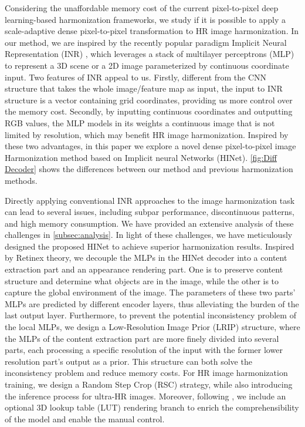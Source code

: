 \documentclass[10pt,journal,twocolumn,twoside]{IEEEtran}
\begin{document}
Considering the unaffordable memory cost of the current pixel-to-pixel deep learning-based harmonization frameworks, we study if it is possible to apply a scale-adaptive dense pixel-to-pixel transformation to HR image harmonization. In our method, we are inspired by the recently popular paradigm Implicit Neural Representation (INR) \cite{sitzmann2020implicit, tancik2020fourier}, which leverages a stack of multilayer perceptrons (MLP) to represent a 3D scene \cite{mildenhall2021nerf} or a 2D image \cite{sitzmann2020implicit} parameterized by continuous coordinate input. Two features of INR appeal to us. Firstly, different from the CNN structure that takes the whole image/feature map as input, the input to INR structure is a vector containing grid coordinates, providing us more control over the memory cost. Secondly, by inputting continuous coordinates  and outputting RGB values, the MLP models in its weights a continuous image that is not limited by resolution, which may benefit HR image harmonization. Inspired by these two advantages, in this paper we explore a novel dense pixel-to-pixel image Harmonization method based on Implicit neural Networks (HINet). \cref{fig:Diff Decoder} shows the differences between our method and previous harmonization methods. 


Directly applying conventional INR approaches to the image harmonization task can lead to several issues, including subpar performance, discontinuous patterns, and high memory consumption. We have provided an extensive analysis of these challenges in \cref{subsec:analysis}. In light of these challenges, we have meticulously designed the proposed HINet to achieve superior harmonization results. Inspired by Retinex theory\cite{land1971lightness, land1977retinex}, we decouple the MLPs in the HINet decoder into a content extraction part and an appearance rendering part. One is to preserve content structure and determine what objects are in the image, while the other is to capture the global environment of the image. The parameters of these two parts' MLPs are predicted by different encoder layers, thus alleviating the burden of the last output layer. Furthermore, to prevent the potential inconsistency problem of the local MLPs, we design a Low-Resolution Image Prior (LRIP) structure, where the MLPs of the content extraction part are more finely divided into several parts, each processing a specific resolution of the input with the former lower resolution part's output as a prior. This structure can both solve the inconsistency problem and reduce memory costs. For HR image harmonization training, we design a Random Step Crop (RSC) strategy, while also introducing the inference process for ultra-HR images. Moreover, following \cite{ke2022harmonizer, xue2022dccf}, we include an optional 3D lookup table (LUT)\cite{karaimer2016software, zeng2020learning} rendering branch to enrich the comprehensibility of the model and enable the manual control.
\end{document}

